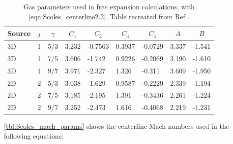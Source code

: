 \begin{table}[]
	\centering
	\begin{tabular}{lllllllll}
		\hline
		\multicolumn{1}{c}{Source} & \multicolumn{1}{c}{$j$} & \multicolumn{1}{c}{$\gamma$} & \multicolumn{1}{c}{$C_1$} & \multicolumn{1}{c}{$C_2$} & \multicolumn{1}{c}{$C_3$} & \multicolumn{1}{c}{$C_4$} & \multicolumn{1}{c}{$A$} & \multicolumn{1}{c}{$B$} \\ \hline
		3D                         & 1                     & 5/3                          & 3.232                     & -0.7563                   & 0.3937                    & -0.0729                   & 3.337                & -1.541                \\
		3D                         & 1                     & 7/5                          & 3.606                     & -1.742                    & 0.9226                    & -0.2069                   & 3.190                 & -1.610                \\
		3D                         & 1                     & 9/7                          & 3.971                     & -2.327                    & 1.326                     & -0.311                    & 3.609                 & -1.950                \\
		2D                         & 2                     & 5/3                          & 3.038                     & -1.629                    & 0.9587                    & -0.2229                   & 2.339                 & -1.194                \\
		2D                         & 2                     & 7/5                          & 3.185                     & -2.195                    & 1.391                     & -0.3436                   & 2.261                 & -1.224                \\
		2D                         & 2                     & 9/7                          & 3.252                     & -2.473                    & 1.616                     & -0.4068                   & 2.219                 & -1.231               
	\end{tabular}
\caption{Gas parameters used in free expansion calculations, with \cref{eqn:Scoles_centerline2.2}. Table recreated from Ref \cite{millerFreeJetSources1988}.}
\label{tbl:Scoles_gas_params2.2}
\end{table}


\cref{tbl:Scoles_mach_params} shows the centerline Mach numbers used in the following equations:

